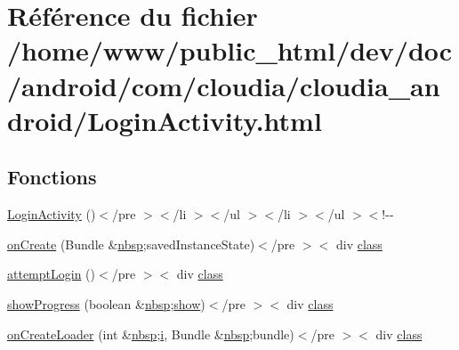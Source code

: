 \hypertarget{_login_activity_8html}{\section{Référence du fichier /home/www/public\-\_\-html/dev/doc/android/com/cloudia/cloudia\-\_\-android/\-Login\-Activity.html}
\label{_login_activity_8html}
}
\subsection*{Fonctions}
\begin{DoxyCompactItemize}
\item 
\hyperlink{_login_activity_8html_a78e5ebf38ae3ee3c3f97cf22b45520ce}{Login\-Activity} ()$<$/pre $>$$<$/li $>$$<$/ul $>$$<$/li $>$$<$/ul $>$$<$!-\/-\/
\item 
\hyperlink{_login_activity_8html_aba0a51a46194045c19fd67aa9ed0dd44}{on\-Create} (Bundle \&\hyperlink{_tools_8html_aef915316f784c9063d942974538301a6}{nbsp};saved\-Instance\-State)$<$/pre $>$$<$ div \hyperlink{_tools_8html_acf06f836132665ba8114f5a414c2403f}{class}
\item 
\hyperlink{_login_activity_8html_acefcae8d835ffa2ec3eafa71cead58b3}{attempt\-Login} ()$<$/pre $>$$<$ div \hyperlink{_tools_8html_acf06f836132665ba8114f5a414c2403f}{class}
\item 
\hyperlink{_login_activity_8html_a114b8b79a5f88eba9ee0cddc5d5d47b6}{show\-Progress} (boolean \&\hyperlink{_tools_8html_aef915316f784c9063d942974538301a6}{nbsp};\hyperlink{script_8js_a158319aa84db2086ce4f90b3e62f8a38}{show})$<$/pre $>$$<$ div \hyperlink{_tools_8html_acf06f836132665ba8114f5a414c2403f}{class}
\item 
\hyperlink{_login_activity_8html_a0cb56113a762c3e575d769c43943ec51}{on\-Create\-Loader} (int \&\hyperlink{_tools_8html_aef915316f784c9063d942974538301a6}{nbsp};\hyperlink{_login_activity_8html_a7e98b8a17c0aad30ba64d47b74e2a6c1}{i}, Bundle \&\hyperlink{_tools_8html_aef915316f784c9063d942974538301a6}{nbsp};bundle)$<$/pre $>$$<$ div \hyperlink{_tools_8html_acf06f836132665ba8114f5a414c2403f}{class}
\end{DoxyCompactItemize}
